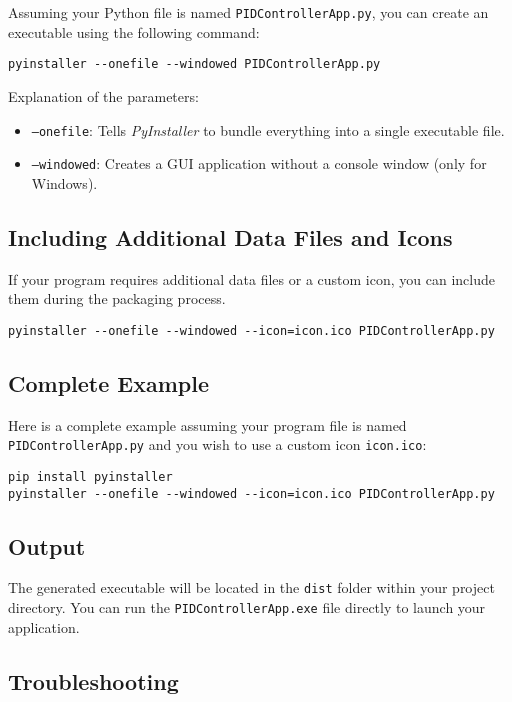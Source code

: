 \documentclass{article}
\begin{document}
Assuming your Python file is named \texttt{PIDControllerApp.py}, you can create an executable using the following command:

\begin{verbatim}
pyinstaller --onefile --windowed PIDControllerApp.py
\end{verbatim}

Explanation of the parameters:
\begin{itemize}
    \item \texttt{--onefile}: Tells \textit{PyInstaller} to bundle everything into a single executable file.
    \item \texttt{--windowed}: Creates a GUI application without a console window (only for Windows).
\end{itemize}

\subsection{Including Additional Data Files and Icons}

If your program requires additional data files or a custom icon, you can include them during the packaging process.

\begin{verbatim}
pyinstaller --onefile --windowed --icon=icon.ico PIDControllerApp.py
\end{verbatim}

\subsection{Complete Example}

Here is a complete example assuming your program file is named \texttt{PIDControllerApp.py} and you wish to use a custom icon \texttt{icon.ico}:

\begin{verbatim}
pip install pyinstaller
pyinstaller --onefile --windowed --icon=icon.ico PIDControllerApp.py
\end{verbatim}

\subsection{Output}

The generated executable will be located in the \texttt{dist} folder within your project directory. You can run the \texttt{PIDControllerApp.exe} file directly to launch your application.

\subsection{Troubleshooting}
\end{document}
